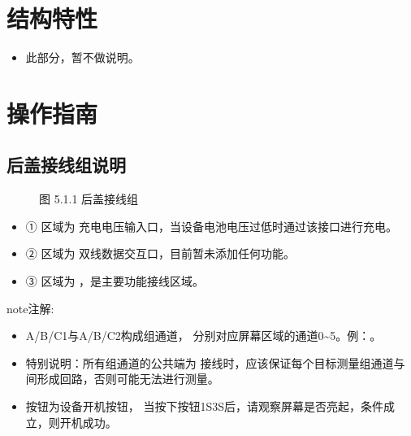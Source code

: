 \documentclass[a4paper,10pt,english]{sphinxmanual}
\begin{document}
\section{结构特性}
\label{\detokenize{structural_characteristics:id1}}\label{\detokenize{structural_characteristics::doc}}\begin{itemize}
\item {} 
\sphinxAtStartPar
此部分，暂不做说明。

\end{itemize}


\section{操作指南}
\label{\detokenize{operation_guide:id1}}\label{\detokenize{operation_guide::doc}}

\subsection{后盖接线组说明}
\label{\detokenize{operation_guide:id2}}
\begin{figure}[htbp]
\centering
\capstart

\noindent{}
\caption{图 5.1.1 后盖接线组}\label{\detokenize{operation_guide:id6}}\end{figure}
\begin{itemize}
\item {} 
\sphinxAtStartPar
① 区域为  充电电压输入口，当设备电池电压过低时通过该接口进行充电。

\item {} 
\sphinxAtStartPar
② 区域为  双线数据交互口，目前暂未添加任何功能。

\item {} 
\sphinxAtStartPar
③ 区域为  ，是主要功能接线区域。

\end{itemize}

\begin{sphinxadmonition}{note}{注解:}\begin{itemize}
\item {} 
\sphinxAtStartPar
A/B/C1与A/B/C2构成组通道， 分别对应屏幕区域的通道0\textasciitilde{}5。例：。

\item {} 
\sphinxAtStartPar
特别说明：所有组通道的公共端为  接线时，应该保证每个目标测量组通道与  间形成回路，否则可能无法进行测量。

\item {} 
\sphinxAtStartPar
{} 按钮为设备开机按钮， 当按下按钮1S\sphinxhyphen{}3S后，请观察屏幕是否亮起，条件成立，则开机成功。

\end{itemize}
\end{sphinxadmonition}
\end{document}
